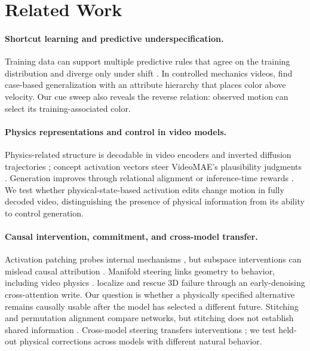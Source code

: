 \section{Related Work}

\paragraph{Shortcut learning and predictive underspecification.}
Training data can support multiple predictive rules that agree on the training
distribution and diverge only under shift
\citep{geirhos2020shortcut,damour2022underspecification}.
In controlled mechanics videos, \citet{kang2025physical} find case-based
generalization with an attribute hierarchy that places color above velocity.
Our cue sweep also reveals the reverse relation: observed motion can select its
training-associated color.

\paragraph{Physics representations and control in video models.}
Physics-related structure is decodable in video encoders
\citep{joseph2026interpreting} and inverted diffusion trajectories
\citep{esmati2026invisible}; concept activation vectors steer VideoMAE's
plausibility judgments \citep{alam2026causal}. Generation improves through
relational alignment \citep{zhang2025videorepa} or inference-time rewards
\citep{yuan2026physicsalignment}. We test whether physical-state-based activation
edits change motion in fully decoded video, distinguishing the presence of
physical information from its ability to control generation.

\paragraph{Causal intervention, commitment, and cross-model transfer.}
Activation patching probes internal mechanisms
\citep{meng2022locating,zhang2024patching}, but subspace interventions can
mislead causal attribution \citep{makelov2024subspace}. Manifold steering links
geometry to behavior, including video physics \citep{wurgaft2026manifold}.
\citet{plattner2026circuits} localize and rescue 3D failure through an
early-denoising cross-attention write. Our question is whether a physically
specified alternative remains causally usable after the model has selected a
different future.
Stitching \citep{bansal2021stitching} and permutation alignment
\citep{ainsworth2023git} compare networks, but stitching does not establish
shared information \citep{smith2025alignment}. Cross-model steering transfers
interventions \citep{oozeer2025activationtransfer,poppi2026crossmodel}; we test
held-out physical corrections across models with different natural behavior.
